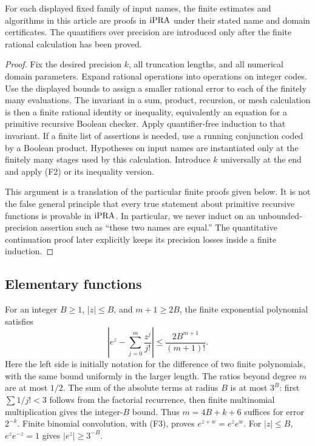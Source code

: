 \begin{proposition}\label{prop:arithmetic-reading}
For each displayed fixed family of input names, the finite estimates and
algorithms in this article are proofs in $\mathrm{iPRA}$ under their stated name
and domain certificates. The quantifiers over precision are introduced
only after the finite rational calculation has been proved.
\end{proposition}
\begin{proof}
Fix the desired precision $k$, all truncation lengths, and all numerical
domain parameters. Expand rational operations into operations on integer
codes. Use the displayed bounds to assign a smaller rational error to
each of the finitely many evaluations. The invariant in a sum, product,
recursion, or mesh calculation is then a finite rational identity or
inequality, equivalently an equation for a primitive recursive Boolean
checker. Apply quantifier-free induction to that invariant. If a finite
list of assertions is needed, use a running conjunction coded by a
Boolean product. Hypotheses on input names are instantiated only at the
finitely many stages used by this calculation. Introduce $k$ universally
at the end and apply (F2) or its inequality version.

This argument is a translation of the particular finite proofs given
below. It is not the false general principle that every true statement
about primitive recursive functions is provable in $\mathrm{iPRA}$. In particular,
we never induct on an unbounded-precision assertion such as ``these two
names are equal.'' The quantitative continuation proof later explicitly
keeps its precision losses inside a finite induction.
\end{proof}

\subsection{Elementary functions}
For an integer $B\ge1$, $|z|\le B$, and $m+1\ge2B$, the finite
exponential polynomial satisfies
\[
 \left|e^z-\sum_{j=0}^m\frac{z^j}{j!}\right|
 \le\frac{2B^{m+1}}{(m+1)!}.                     \tag{F3}\label{eq:exp-tail}
\]
Here the left side is initially notation for the difference of two finite
polynomials, with the same bound uniformly in the larger length. The
ratios beyond degree $m$ are at most $1/2$. The sum of the absolute terms
at radius $B$ is at most $3^B$: first $\sum1/j!<3$ follows from the
factorial recurrence, then finite multinomial multiplication gives the
integer-$B$ bound. Thus $m=4B+k+6$ suffices for error $2^{-k}$.
Finite binomial convolution, with (F3), proves $e^{z+w}=e^ze^w$.
For $|z|\le B$, $e^z e^{-z}=1$ gives $|e^z|\ge3^{-B}$.

